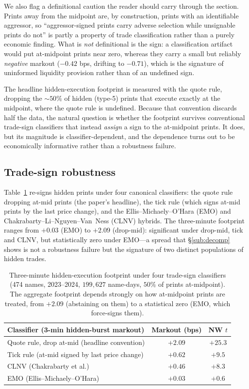 \documentclass[11pt]{article}
\begin{document}
We also flag a definitional caution the reader should carry through the section. Prints
away from the midpoint are, by construction, prints with an identifiable aggressor, so
``aggressor-signed prints carry adverse selection while unsignable prints do not'' is
partly a property of trade classification rather than a purely economic finding. What is
\emph{not} definitional is the sign: a classification artifact would put at-midpoint prints
near zero, whereas they carry a small but reliably \emph{negative} markout ($-0.42$ bps,
drifting to $-0.71$), which is the signature of uninformed liquidity provision rather than
of an undefined sign.

The headline hidden-execution footprint is measured with the quote rule, dropping the
$\sim\!50\%$ of hidden (type-5) prints that execute exactly at the midpoint, where the
quote rule is undefined. Because that convention discards half the data, the natural
question is whether the footprint survives conventional trade-sign classifiers that
instead \emph{assign} a sign to the at-midpoint prints. It does, but its magnitude is
classifier-dependent, and the dependence turns out to be economically informative rather
than a robustness failure.

\subsection{Trade-sign robustness}
\label{sub:signing}
Table~\ref{tab:signing} re-signs hidden prints under four canonical classifiers: the
quote rule dropping at-mid prints (the paper's headline), the tick rule (which signs
at-mid prints by the last price change), and the Ellis--Michaely--O'Hara (EMO) and
Chakrabarty--Li--Nguyen--Van~Ness (CLNV) hybrids. The three-minute footprint ranges from
$+0.03$ (EMO) to $+2.09$ (drop-mid): significant under drop-mid, tick and CLNV, but
statistically zero under EMO---a spread that \S\ref{sub:decomp} shows is not a robustness
failure but the signature of two distinct populations of hidden trades.

\begin{table}[htbp]
\centering
\begin{tabular}{lcc}
\toprule
\textbf{Classifier (3-min hidden-burst markout)} & \textbf{Markout (bps)} & \textbf{NW $t$} \\
\midrule
Quote rule, drop at-mid (headline convention) & $+2.09$ & $+25.3$ \\
Tick rule (at-mid signed by last price change) & $+0.62$ & $+9.5$ \\
CLNV (Chakrabarty et al.) & $+0.46$ & $+8.3$ \\
EMO (Ellis--Michaely--O'Hara) & $+0.03$ & $+0.6$ \\
\bottomrule
\end{tabular}
\caption{Three-minute hidden-execution footprint under four trade-sign classifiers
(474 names, 2023--2024, $199{,}627$ name-days, $50\%$ of prints at-midpoint). The
aggregate footprint depends strongly on how at-midpoint prints are treated, from $+2.09$
(abstaining on them) to a statistical zero (EMO, which force-signs them).}
\label{tab:signing}
\end{table}
\end{document}
